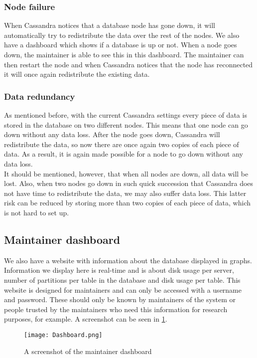 \documentclass[../Main.tex]{subfiles}
\begin{document}
\subsubsection{Node failure}
When Cassandra notices that a database node has gone down, it will automatically try to redistribute the data over the rest of the nodes. We also have a dashboard which shows if a database is up or not. When a node goes down, the maintainer is able to see this in this dashboard. The maintainer can then restart the node and when Cassandra notices that the node has reconnected it will once again redistribute the existing data. 

\subsubsection{Data redundancy}
As mentioned before, with the current Cassandra settings every piece of data is stored in the database on two different nodes. This means that one node can go down without any data loss. After the node goes down, Cassandra will redistribute the data, so now there are once again two copies of each piece of data. As a result, it is again made possible for a node to go down without any data loss. \\

It should be mentioned, however, that when all nodes are down, all data will be lost. Also, when two nodes go down in such quick succession that Cassandra does not have time to redistribute the data, we may also suffer data loss. This latter risk can be reduced by storing more than two copies of each piece of data, which is not hard to set up. 

\subsection{Maintainer dashboard}
We also have a website with information about the database displayed in graphs. Information we display here is real-time and is about disk usage per server, number of partitions per table in the database and disk usage per table. This website is designed for maintainers and can only be accessed with a username and password. These should only be known by maintainers of the system or people trusted by the maintainers who need this information for research purposes, for example. A screenshot can be seen in \cref{fig:dashboard}.
\begin{figure}
    \centering
    \texttt{[image: Dashboard.png]}
    \caption{A screenshot of the maintainer dashboard}
    \label{fig:dashboard}
\end{figure}
\end{document}
